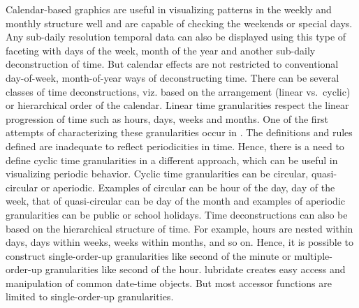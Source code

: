 \documentclass[12pt]{article}
\begin{document}
Calendar-based graphics \citep{wang2018calendar} are useful in visualizing patterns in the weekly and monthly structure well and are capable of checking the weekends or special days. Any sub-daily resolution temporal data can also be displayed using this type of faceting \citep{Wickham2009pk} with days of the week, month of the year and another sub-daily deconstruction of time. But calendar effects are not restricted to conventional day-of-week, month-of-year ways of deconstructing time. There can be several classes of time deconstructions, viz. based on the arrangement (linear vs.~cyclic) or hierarchical order of the calendar. Linear time granularities respect the linear progression of time such as hours, days, weeks and months. One of the first attempts of characterizing these granularities occur in \citet{Bettini1998-ed}. The definitions and rules defined are inadequate to reflect periodicities in time. Hence, there is a need to define cyclic time granularities in a different approach, which can be useful in visualizing periodic behavior. Cyclic time granularities can be circular, quasi-circular or aperiodic. Examples of circular can be hour of the day, day of the week, that of quasi-circular can be day of the month and examples of aperiodic granularities can be public or school holidays. Time deconstructions can also be based on the hierarchical structure of time. For example, hours are nested within days, days within weeks, weeks within months, and so on. Hence, it is possible to construct single-order-up granularities like second of the minute or multiple-order-up granularities like second of the hour. lubridate \citep{G_Grolemund2011-vm} creates easy access and manipulation of common date-time objects. But most accessor functions are limited to single-order-up granularities.
\end{document}
